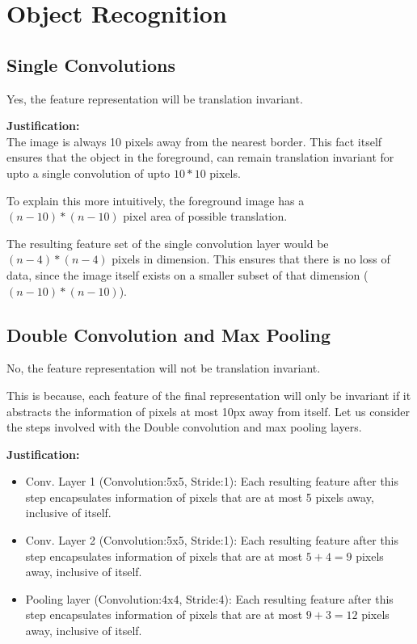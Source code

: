 \documentclass[parskip=half]{scrartcl}
\begin{document}


\section{Object Recognition} %
\label{sec:object_recognition}

    \subsection{Single Convolutions} %
    \label{sub:single_convolutions}

        Yes, the feature representation will be translation invariant.

        \textbf{Justification:}\\
        The image is always 10 pixels away from the nearest border. This fact itself ensures that the object in the foreground, can remain translation invariant for upto a single convolution of upto $10*10$ pixels.

        To explain this more intuitively, the foreground image has a $(n-10)*(n-10)$ pixel area of possible translation.

        The resulting feature set of the single convolution layer would be $(n-4)*(n-4)$ pixels in dimension. This ensures that there is no loss of data, since the image itself exists on a smaller subset of that dimension ($(n-10)*(n-10)$).
    


    \subsection{Double Convolution and Max Pooling} %
    \label{sub:double_convolution_and_max_pooling}

        No, the feature representation will not be translation invariant.

        This is because, each feature of the final representation will only be invariant if it abstracts the information of pixels at most 10px away from itself. Let us consider the steps involved with the Double convolution and max pooling layers.

        \textbf{Justification:}\\
        \begin{itemize}
            \item 
            Conv. Layer 1 (Convolution:5x5, Stride:1): Each resulting feature after this step encapsulates information of pixels that are at most 5 pixels away, inclusive of itself. 
            \item 
            Conv. Layer 2 (Convolution:5x5, Stride:1): Each resulting feature after this step encapsulates information of pixels that are at most $5 + 4 = 9$ pixels away, inclusive of itself.
            \item 
            Pooling layer (Convolution:4x4, Stride:4): Each resulting feature after this step encapsulates information of pixels that are at most $9 + 3 = 12$ pixels away, inclusive of itself.
        \end{itemize}
\end{document}
